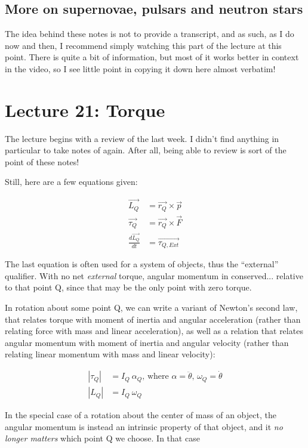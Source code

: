 \subsection{More on supernovae, pulsars and neutron stars}

The idea behind these notes is not to provide a transcript, and as such, as I do now and then, I recommend simply watching this part of the lecture at this point. There is quite a bit of information, but most of it works better in context in the video, so I see little point in copying it down here almost verbatim!

\section{Lecture 21: Torque}

The lecture begins with a review of the last week. I didn't find anything in particular to take notes of again. After all, being able to review is sort of the point of these notes!

Still, here are a few equations given:

\begin{align}
\vec{L_Q} &= \vec{r_Q} \times \vec{p}\\
\vec{\tau_Q} &= \vec{r_Q} \times \vec{F}\\
\frac{d\vec{L_Q}}{dt} &= \vec{\tau_{Q,Ext}}
\end{align}

The last equation is often used for a system of objects, thus the ``external'' qualifier. With no net \emph{external} torque, angular momentum in conserved... relative to that point Q, since that may be the only point with zero torque.

In rotation about some point Q, we can write a variant of Newton's second law, that relates torque with moment of inertia and angular acceleration (rather than relating force with mass and linear acceleration), as well as a relation that relates angular momentum with moment of inertia and angular velocity (rather than relating linear momentum with mass and linear velocity):

\begin{align}
|\tau_Q| &= I_Q\ \alpha_Q \text{, where $\alpha = \ddot{\theta}$, $\omega_Q = \dot{\theta}$}\\
|L_Q|    &= I_Q\ \omega_Q
\end{align}

In the special case of a rotation about the center of mass of an object, the angular momentum is instead an intrinsic property of that object, and it \emph{no longer matters} which point Q we choose. In that case

